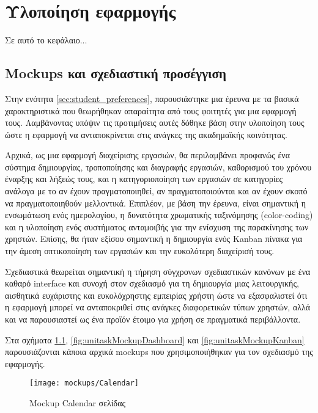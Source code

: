 \chapter{Υλοποίηση εφαρμογής} \label{ch:unitask}
    Σε αυτό το κεφάλαιο...

    \section{Mockups και σχεδιαστική προσέγγιση}
        Στην ενότητα \ref{sec:student_preferences}, παρουσιάστηκε μια έρευνα με τα βασικά χαρακτηριστικά που θεωρήθηκαν απαραίτητα από τους φοιτητές για μια εφαρμογή τους. Λαμβάνοντας υπόψιν τις προτιμήσεις αυτές δόθηκε βάση στην υλοποίηση τους ώστε η εφαρμογή να ανταποκρίνεται στις ανάγκες της ακαδημαϊκής κοινότητας.

        Αρχικά, ως μια εφαρμογή διαχείρισης εργασιών, θα περιλαμβάνει προφανώς ένα σύστημα δημιουργίας, τροποποίησης και διαγραφής εργασιών, καθορισμού του χρόνου έναρξης και λήξεώς τους, και η κατηγοριοποίηση των εργασιών σε κατηγορίες ανάλογα με το αν έχουν πραγματοποιηθεί, αν πραγματοποιούνται και αν έχουν σκοπό να πραγματοποιηθούν μελλοντικά. Επιπλέον, με βάση την έρευνα, είναι σημαντική η ενσωμάτωση ενός ημερολογίου, η δυνατότητα χρωματικής ταξινόμησης (color-coding) και η υλοποίηση ενός συστήματος ανταμοιβής για την ενίσχυση της παρακίνησης των χρηστών. Επίσης, θα ήταν εξίσου σημαντική η δημιουργία ενός Kanban πίνακα για την άμεση οπτικοποίηση των εργασιών και την ευκολότερη διαχείρισή τους.

        Σχεδιαστικά θεωρείται σημαντική η τήρηση σύγχρονων σχεδιαστικών κανόνων με ένα καθαρό interface και συνοχή στον σχεδιασμό για τη δημιουργία μιας λειτουργικής, αισθητικά ευχάριστης και ευκολόχρηστης εμπειρίας χρήστη ώστε να εξασφαλιστεί ότι η εφαρμογή μπορεί να ανταποκριθεί στις ανάγκες διαφορετικών τύπων χρηστών, αλλά και να παρουσιαστεί ως ένα προϊόν έτοιμο για χρήση σε πραγματικά περιβάλλοντα.

        Στα σχήματα \ref{fig:unitaskMockupCalendar}, \ref{fig:unitaskMockupDashboard} και \ref{fig:unitaskMockupKanban} παρουσιάζονται κάποια αρχικά mockups που χρησιμοποιήθηκαν για τον σχεδιασμό της εφαρμογής.

        \begin{figure}[p!] \noindent \centering
            \texttt{[image: mockups/Calendar]}
            \caption{\centering Mockup Calendar σελίδας}
            \label{fig:unitaskMockupCalendar}
        \end{figure}

